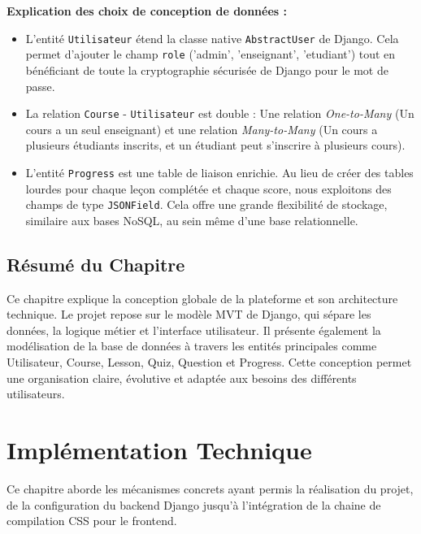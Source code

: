 \documentclass[12pt,a4paper]{report}
\begin{document}
\textbf{Explication des choix de conception de données :}
\begin{itemize}
    \item L'entité \texttt{Utilisateur} étend la classe native \texttt{AbstractUser} de Django. Cela permet d'ajouter le champ \texttt{role} ('admin', 'enseignant', 'etudiant') tout en bénéficiant de toute la cryptographie sécurisée de Django pour le mot de passe.
    \item La relation \texttt{Course} - \texttt{Utilisateur} est double : Une relation \textit{One-to-Many} (Un cours a un seul enseignant) et une relation \textit{Many-to-Many} (Un cours a plusieurs étudiants inscrits, et un étudiant peut s'inscrire à plusieurs cours).
    \item L'entité \texttt{Progress} est une table de liaison enrichie. Au lieu de créer des tables lourdes pour chaque leçon complétée et chaque score, nous exploitons des champs de type \texttt{JSONField}. Cela offre une grande flexibilité de stockage, similaire aux bases NoSQL, au sein même d'une base relationnelle.
\end{itemize}

\section*{Résumé du Chapitre}

Ce chapitre explique la conception globale de la plateforme et son architecture technique. Le projet repose sur le modèle MVT de Django, qui sépare les données, la logique métier et l’interface utilisateur. Il présente également la modélisation de la base de données à travers les entités principales comme Utilisateur, Course, Lesson, Quiz, Question et Progress. Cette conception permet une organisation claire, évolutive et adaptée aux besoins des différents utilisateurs.


\chapter{Implémentation Technique}

Ce chapitre aborde les mécanismes concrets ayant permis la réalisation du projet, de la configuration du backend Django jusqu'à l'intégration de la chaine de compilation CSS pour le frontend.
\end{document}
